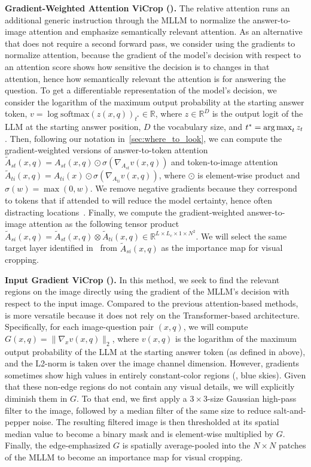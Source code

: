 \textbf{Gradient-Weighted Attention ViCrop (\gra{}).} The relative attention runs an additional generic instruction through the MLLM to normalize the answer-to-image attention and emphasize semantically relevant attention. As an alternative that does not require a second forward pass, we consider using the gradients to normalize attention, because the gradient of the model's decision with respect to an attention score shows how sensitive the decision is to changes in that attention, hence how semantically relevant the attention is for answering the question.
To get a differentiable representation of the model's decision, we consider the logarithm of the maximum output probability at the starting answer token, $v = \log \text{softmax}(z(x,q))_{t^*} \in \mathbb{R}$, where $z \in \mathbb{R}^{D}$ is the output logit of the LLM at the starting answer position, $D$ the vocabulary size, and $t^* = \operatorname*{arg\,max}_t z_t$. Then, following our notation in~\cref{sec:where_to_look}, we can compute the gradient-weighted versions of answer-to-token attention $\tilde{A}_{st}(x,q) = A_{st}(x,q) \odot \sigma(\nabla_{A_{st}}v(x,q))$ and token-to-image attention $\tilde{A}_{ti}(x,q) = A_{ti}(x) \odot \sigma(\nabla_{A_{ti}}v(x,q))$, where $\odot$ is element-wise product and $\sigma(w)=\max(0, w)$. We remove negative gradients because they correspond to tokens that if attended to will reduce the model certainty, hence often distracting locations~\cite{gradcam}. Finally, we compute the gradient-weighted answer-to-image attention as the following tensor product $\tilde{A}_{si}(x,q) = \tilde{A}_{st}(x,q) \otimes \tilde{A}_{ti}(x,q) \in \mathbb{R}^{L \times L_c \times 1 \times N^2}$. We will select the same target layer identified in~\rel{} from $\tilde{A}_{si}(x,q)$ as the importance map for visual cropping.

\textbf{Input Gradient ViCrop (\pgra{}).} In this method, we seek to find the relevant regions on the image directly using the gradient of the MLLM's decision with respect to the input image. Compared to the previous attention-based methods, \pgra{} is more versatile because it does not rely on the Transformer-based architecture. Specifically, for each image-question pair $(x,q)$, we will compute $G(x,q) = \lVert \nabla_x v(x,q) \lVert_2$, where $v(x,q)$ is the logarithm of the maximum output probability of the LLM at the starting answer token (as defined in \gra{} above), and the L2-norm is taken over the image channel dimension. However, gradients sometimes show high values in entirely constant-color regions (\eg, blue skies). Given that these non-edge regions do not contain any visual details, we will explicitly diminish them in $G$. To that end, we first apply a $3\times 3$-size Gaussian high-pass filter to the image, followed by a median filter of the same size to reduce salt-and-pepper noise. The resulting filtered image is then thresholded at its spatial median value to become a binary mask and is element-wise multiplied by $G$. Finally, the edge-emphasized $G$ is spatially average-pooled into the $N\times N$ patches of the MLLM to become an importance map for visual cropping.


